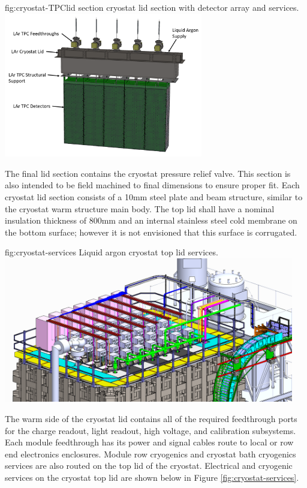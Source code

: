 \begin{dunefigure}{fig:cryostat-TPClid}
{ section cryostat lid section with detector array and services.}
\includegraphics[width=0.65\textwidth]{graphics/cryostat/cryostat-TPClid.png}
\end{dunefigure}

The final lid section contains the cryostat pressure relief valve.  This section is also intended to be field machined to final dimensions to ensure proper fit.  Each cryostat lid section consists of a 10mm steel plate and beam structure, similar to the cryostat warm structure main body.  The top lid shall have a nominal insulation thickness of 800mm and an internal stainless steel cold membrane on the bottom surface; however it is not envisioned that this surface is corrugated.

\begin{dunefigure}{fig:cryostat-services}
{Liquid argon cryostat top lid services.}
\includegraphics[width=0.95\textwidth]{graphics/cryostat/cryostat-services.png}
\end{dunefigure}

The warm side of the cryostat lid contains all of the required feedthrough ports for the charge readout, light readout, high voltage, and calibration subsystems.  Each module feedthrough has its power and signal cables route to local or row end electronics enclosures.  Module row cryogenics and cryostat bath cryogenics services are also routed on the top lid of the cryostat.  Electrical and cryogenic services on the cryostat top lid are shown below in Figure \ref{fig:cryostat-services}.

